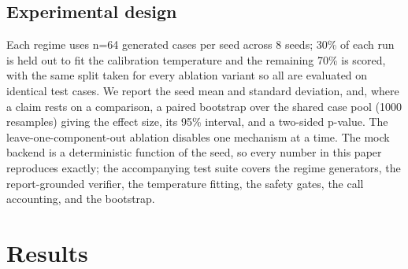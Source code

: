 \documentclass[12pt]{article}
\begin{document}
\subsection{Experimental design}

Each regime uses n=64 generated cases per seed across 8 seeds; 30\% of each run is held out to fit the calibration temperature and the remaining 70\% is scored, with the same split taken for every ablation variant so all are evaluated on identical test cases. We report the seed mean and standard deviation, and, where a claim rests on a comparison, a paired bootstrap over the shared case pool (1000 resamples) giving the effect size, its 95\% interval, and a two-sided p-value. The leave-one-component-out ablation disables one mechanism at a time. The mock backend is a deterministic function of the seed, so every number in this paper reproduces exactly; the accompanying test suite covers the regime generators, the report-grounded verifier, the temperature fitting, the safety gates, the call accounting, and the bootstrap.

\section{Results}\label{sec:results}
\end{document}

